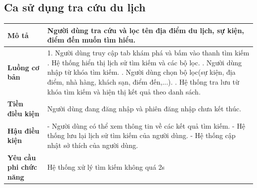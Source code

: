 \subsection{Ca sử dụng tra cứu du lịch}
\vspace{0.5cm}


\noindent 
\begin{tabularx}{\linewidth}{| l | X |} 
\hline 
\textbf{Mô tả} & Người dùng tra cứu và lọc tên địa điểm du lịch, sự kiện, điểm đến muốn tìm hiểu.  \\ 
\hline 
\textbf{Luồng cơ bản} & 1. Người dùng truy cập tab khám phá và bấm vào thanh tìm kiếm \newline
                       2. Hệ thống hiển thị lịch sử tìm kiếm và các bộ lọc. \newline
                       3. Người dùng nhập từ khóa tìm kiếm. \newline
                       4. Người dùng chọn bộ lọc(sự kiện, địa điểm, nhà hàng, khách sạn, điểm đến,...). \newline
                       5. Hệ thống tra lưu từ khóa tìm kiếm và hiện thị kết quả theo danh sách. \\

                         
\hline 
\textbf{Tiền điều kiện} & Người dùng đang đăng nhập và phiên đăng nhập chưa kết thúc. \\
\hline 
\textbf{Hậu điều kiện} & - Người dùng có thể xem thông tin về các kết quả tìm kiếm.\newline
                         - Hệ thống lưu lại lịch sử tìm kiếm của người dùng. \newline
                         - Hệ thống cập nhật sở thích của người dùng. \\

\hline 
\textbf{Yêu cầu phi chức năng} & Hệ thống xử lý tìm kiếm không quá 2s  \\ 
\hline 
\end{tabularx}

\vspace{0.8cm}

